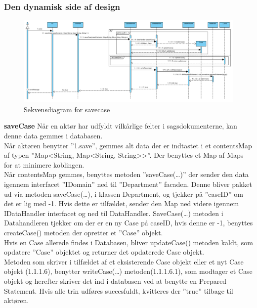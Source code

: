 \subsubsection{Den dynamisk side af design}
\begin{figure}[htb!]
  \includegraphics[width = \linewidth]{./PNG/design/odyn.PNG} 
  \caption{Sekvensdiagram for savecase}
  \label{fig:2savecase}
\end{figure}
\textbf{saveCase}
Når en aktør har udfyldt vilkårlige felter i sagsdokumenterne, kan denne data gemmes i databasen. \\
Når aktøren benytter ”1.save”, gemmes alt data der er indtastet i et contentsMap af typen ”Map\textless String, Map\textless String, String\textgreater \textgreater ”. Der benyttes et Map af Maps for at minimere koblingen. \\
Når contentsMap gemmes, benyttes metoden ”saveCase(…)” der sender den data igennem interfacet ”IDomain” ned til ”Department” facaden. Denne bliver pakket ud via metoden saveCase(…), i klassen Department, og tjekker på ”caseID” om det er lig med -1. Hvis dette er tilfældet, sender den Map ned videre igennem IDataHandler interfacet og ned til DataHandler. SaveCase(…) metoden i Datahandleren tjekker om der er en ny Case på caseID, hvis denne er -1, benyttes createCase() metoden der opretter et ”Case” objekt.\\
Hvis en Case allerede findes i Databasen, bliver updateCase() metoden kaldt, som opdatere ”Case” objektet og returner det opdaterede Case objekt. \\
Metoden som skriver i tilfældet af et eksisterende Case objekt eller et nyt Case objekt (1.1.1.6), benytter writeCase(…) metoden(1.1.1.6.1), som modtager et Case objekt og herefter skriver det ind i databasen ved at benytte en Prepared Statement. 
Hvis alle trin udføres succesfuldt, kvitteres der ”true” tilbage til aktøren. 
